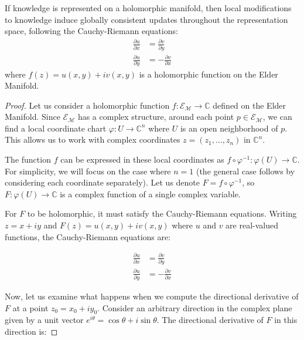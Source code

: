 \begin{theorem}
If knowledge is represented on a holomorphic manifold, then local modifications to knowledge induce globally consistent updates throughout the representation space, following the Cauchy-Riemann equations:
\begin{align}
\frac{\partial u}{\partial x} &= \frac{\partial v}{\partial y} \\
\frac{\partial u}{\partial y} &= -\frac{\partial v}{\partial x}
\end{align}
where $f(z) = u(x,y) + iv(x,y)$ is a holomorphic function on the Elder Manifold.
\end{theorem}

\begin{proof}
Let us consider a holomorphic function $f: \mathcal{E}_{\mathcal{M}} \rightarrow \mathbb{C}$ defined on the Elder Manifold. Since $\mathcal{E}_{\mathcal{M}}$ has a complex structure, around each point $p \in \mathcal{E}_{\mathcal{M}}$, we can find a local coordinate chart $\varphi: U \rightarrow \mathbb{C}^n$ where $U$ is an open neighborhood of $p$. This allows us to work with complex coordinates $z = (z_1, \ldots, z_n)$ in $\mathbb{C}^n$.

The function $f$ can be expressed in these local coordinates as $f \circ \varphi^{-1}: \varphi(U) \rightarrow \mathbb{C}$. For simplicity, we will focus on the case where $n=1$ (the general case follows by considering each coordinate separately). Let us denote $F = f \circ \varphi^{-1}$, so $F: \varphi(U) \rightarrow \mathbb{C}$ is a complex function of a single complex variable.

For $F$ to be holomorphic, it must satisfy the Cauchy-Riemann equations. Writing $z = x + iy$ and $F(z) = u(x,y) + iv(x,y)$ where $u$ and $v$ are real-valued functions, the Cauchy-Riemann equations are:

\begin{align}
\frac{\partial u}{\partial x} &= \frac{\partial v}{\partial y} \\
\frac{\partial u}{\partial y} &= -\frac{\partial v}{\partial x}
\end{align}

Now, let us examine what happens when we compute the directional derivative of $F$ at a point $z_0 = x_0 + iy_0$. Consider an arbitrary direction in the complex plane given by a unit vector $e^{i\theta} = \cos\theta + i\sin\theta$. The directional derivative of $F$ in this direction is:


\end{proof}
